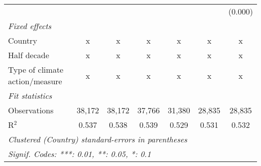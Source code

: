 \begin{tabular}{lcccccc}
                                                            &         &               &               &              &              & (0.000)\\   
   \emph{Fixed effects}\\
   Country                                                  & x       & x             & x             & x            & x            & x\\  
   Half decade                                              & x       & x             & x             & x            & x            & x\\  
   Type of climate action/measure                           & x       & x             & x             & x            & x            & x\\  
   \midrule \emph{Fit statistics}\\
   Observations                                             & 38,172  & 38,172        & 37,766        & 31,380       & 28,835       & 28,835\\  
   R$^2$                                                    & 0.537   & 0.538         & 0.539         & 0.529        & 0.531        & 0.532\\  
   \midrule
   \multicolumn{7}{l}{\emph{Clustered (Country) standard-errors in parentheses}}\\
   \multicolumn{7}{l}{\emph{Signif. Codes: ***: 0.01, **: 0.05, *: 0.1}}\\
\end{tabular}
\par\endgroup


